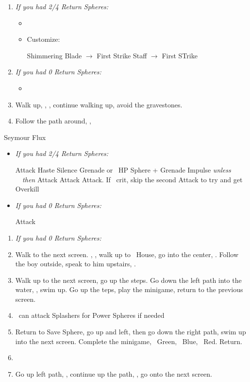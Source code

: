 \begin{enumerate}[resume]
	\item \textit{If you had 2/4 Return Spheres:}
	\begin{itemize}
		\item \formation{\tidus}{\yuna}{\auron} 
		\item Customize:
		\begin{itemize}
			\auronf Shimmering Blade $\rightarrow$ First Strike
			\yunaf Staff $\rightarrow$ First STrike
		\end{itemize}
	\end{itemize}
	\item \textit{If you had 0 Return Spheres:}
	\begin{itemize}
		\item \formation{\tidus}{\kimahri}{\auron}
	\end{itemize}
	\item Walk up, \sd, \cs[1:20], continue walking up, avoid the gravestones.
	\item Follow the path around, \save, \sd
\end{enumerate}
\vfill
\begin{battle}[70000]{Seymour Flux}
\begin{itemize}
	\item \textit{If you had 2/4 Return Spheres:}
	\begin{itemize}
		\yunaf Attack
		\tidusf Haste \yuna
		\switch{\auron}{\rikku}
		\rikkuf Silence Grenade or \od\ HP Sphere + Grenade
		\summon{\bahamut}
		\bahamutf Impulse \textit{unless \rikku\ \od\ then } Attack
		\yunaf Attack
		\tidusf Attack. If \yuna\ crit, skip the second Attack to try and get Overkill
	\end{itemize}
	\item \textit{If you had 0 Return Spheres:}
	\begin{itemize}
		\switch{\tidus}{\yuna}
		\summon{\bahamut}
		\bahamutf Attack
	\end{itemize}
\end{itemize}
\end{battle}
\begin{enumerate}
	\item \textit{If you had 0 Return Spheres:} \formation{\tidus}{\kimahri}{\auron}
	\item Walk to the next screen. \skippablefmv[0:20], \sd, walk up to \tidus\ House, go into the center, \sd. Follow the boy outside, speak to him upstairs, \sd.
	\item Walk up to the next screen, go up the steps. Go down the left path into the water, \sd, swim up. Go up the teps, play the minigame, return to the previous screen.
	\item \tidus\ can attack Splashers for Power Spheres if needed
	\item Return to Save Sphere, go up and left, then go down the right path, swim up into the next screen. Complete the minigame, \rikku\ Green, \tidus\ Blue, \wakka\ Red. Return.
	\item \formation{\tidus}{\yuna}{\auron}
	\item Go up left path, \sd, continue up the path, \save, go onto the next screen.
\end{enumerate}
